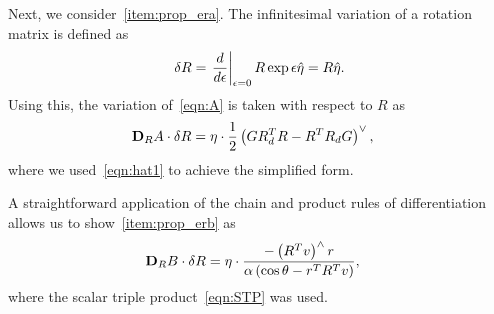 \documentclass[10pt,fleqn]{IJCAS}  %
\begin{document}
\begin{multicols}{2}
Next, we consider~\cref{item:prop_era}.
The infinitesimal variation of a rotation matrix is defined as
\begin{align*}
    \delta R = \left. \frac{d }{d \epsilon} \right|_{\epsilon=0} R \exp{\epsilon \hat{\eta}} = R \hat{\eta} .
\end{align*}
Using this, the variation of~\cref{eqn:A} is taken with respect to \( R \) as
\begin{align*}
	\mathbf{D}_{R} A \cdot \delta R &= \eta \cdot \frac{1}{2} \left( G R_d^T R - R^T R_d G\right)^\vee ,
\end{align*}
where we used~\cref{eqn:hat1} to achieve the simplified form.

A straightforward application of the chain and product rules of differentiation allows us to show~\cref{item:prop_erb} as
\begin{align*}
	\mathbf{D}_{R} B \cdot \delta R &=  \eta \cdot \frac{ - \left( R^T v\right)^\wedge r}{\alpha \left(\cos \theta - r^T R^T v \right)} ,
\end{align*}
where the scalar triple product~\cref{eqn:STP} was used.


\end{multicols}
\end{document}
